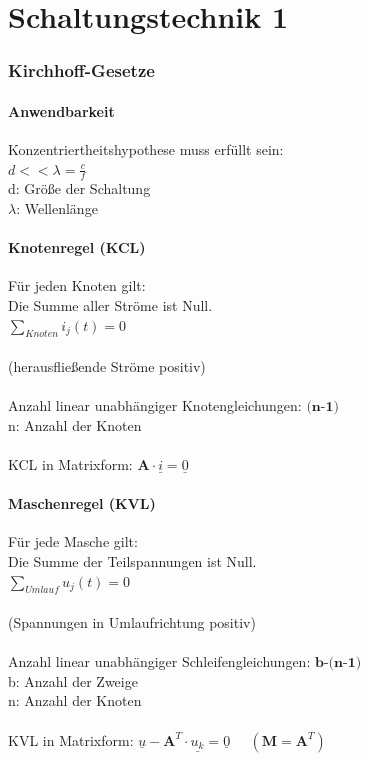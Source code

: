 \documentclass[a4paper,twocolumn,10pt]{article}
\begin{document}
\part*{Schaltungstechnik 1}

\section*{Kirchhoff-Gesetze}
\subsection*{Anwendbarkeit}
Konzentriertheitshypothese muss erfüllt sein:\\
$d<<\lambda = \frac{c}{f}$\\
d: Größe der Schaltung\\
$\lambda$: Wellenlänge

\subsection*{Knotenregel (KCL)}
Für jeden Knoten gilt:\\
Die Summe aller Ströme ist Null.\\
$\sum\limits_{Knoten}^{} i_j(t)=0$\\\\
(herausfließende Ströme positiv)\\\\
Anzahl linear unabhängiger Knotengleichungen: $\textbf{(n-1)}$\\
n: Anzahl der Knoten\\\\
KCL in Matrixform: $\textbf{A}\cdot \underline{i}=\underline{0}$

\subsection*{Maschenregel (KVL)}
Für jede Masche gilt:\\
Die Summe der Teilspannungen ist Null.\\
$\sum\limits_{Umlauf}^{} u_j(t)=0$\\\\
(Spannungen in Umlaufrichtung positiv)\\\\
Anzahl linear unabhängiger Schleifengleichungen: $\textbf{b-(n-1)}$\\
b: Anzahl der Zweige\\
n: Anzahl der Knoten\\\\
KVL in Matrixform: $\underline{u}-\textbf{A}^T\cdot \underline{u_k}=\underline{0}\;\;\;\;\;(\textbf{M}=\textbf{A}^T)$
\end{document}
